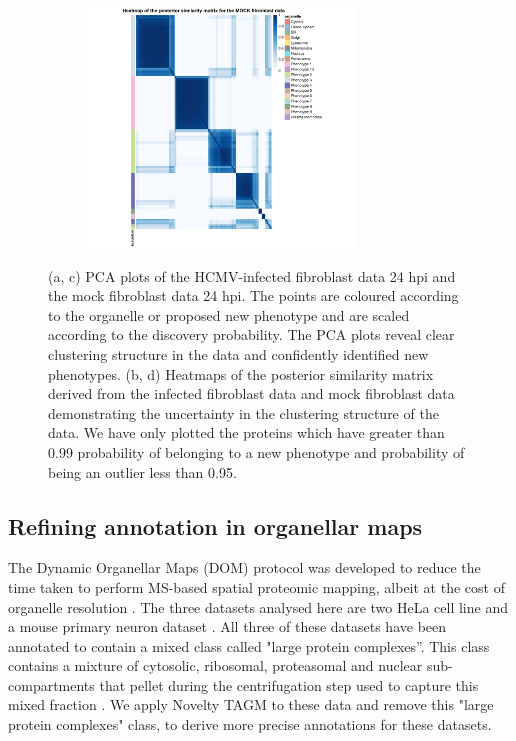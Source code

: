 \documentclass[12pt,english]{article}
\begin{document}
\begin{figure}
\begin{subfigure}[t]{0.5\textwidth}
	\centering
	\includegraphics[height=2.5in]{heatmapMOCK.pdf}
	\caption{}
\end{subfigure}
\caption{(a, c) PCA plots of the HCMV-infected fibroblast data 24 hpi and the mock fibroblast data 24 hpi. The points are coloured according to the organelle or proposed new phenotype and are scaled according to the discovery probability. The PCA plots reveal clear clustering structure in the data and confidently identified new phenotypes. (b, d) Heatmaps of the posterior similarity matrix derived from the infected fibroblast data and mock fibroblast data demonstrating the uncertainty in the clustering structure of the data. We have only plotted the proteins which have greater than 0.99 probability of belonging to a new phenotype and probability of being an outlier less than 0.95.}
 \label{figure:Beltran}
\end{figure}
\clearpage
\subsection{Refining annotation in organellar maps}
The Dynamic Organellar Maps (DOM) protocol was developed to reduce the time taken to perform MS-based spatial proteomic mapping, albeit at the cost of organelle resolution \citep{Itzhak:2016,Gatto:2018}. The three datasets analysed here are two HeLa cell line \citep{Itzhak:2016, Hirst:2018} and a mouse primary neuron dataset \citep{Itzhak::2017}. All three of these datasets have been annotated to contain a mixed class called "large protein complexes''. This class contains a mixture of cytosolic, ribosomal, proteasomal and nuclear sub-compartments that pellet during the centrifugation step used to capture this mixed fraction \citep{Itzhak:2016}. We apply Novelty TAGM to these data and remove this "large protein complexes" class, to derive more precise annotations for these datasets. 
\end{document}
